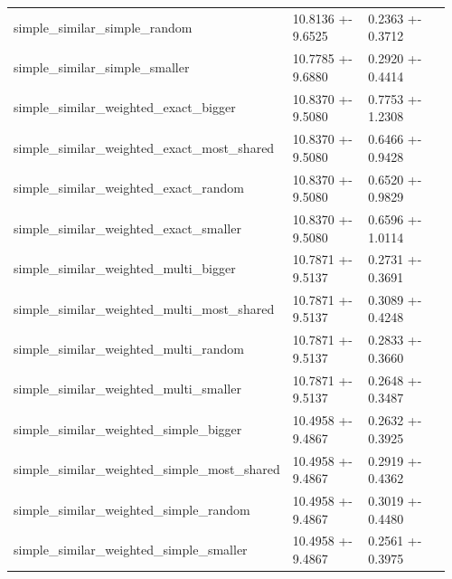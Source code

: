 \begin{table}
\begin{tabular}{p{0.42\linewidth}p{0.24\linewidth}p{0.30\linewidth}}
simple\_similar\_simple\_random & 10.8136 +- 9.6525 & 0.2363 +- 0.3712 \\
simple\_similar\_simple\_smaller & 10.7785 +- 9.6880 & 0.2920 +- 0.4414 \\
simple\_similar\_weighted\_exact\_bigger & 10.8370 +- 9.5080 & 0.7753 +- 1.2308 \\
simple\_similar\_weighted\_exact\_most\_shared & 10.8370 +- 9.5080 & 0.6466 +- 0.9428 \\
simple\_similar\_weighted\_exact\_random & 10.8370 +- 9.5080 & 0.6520 +- 0.9829 \\
simple\_similar\_weighted\_exact\_smaller & 10.8370 +- 9.5080 & 0.6596 +- 1.0114 \\
simple\_similar\_weighted\_multi\_bigger & 10.7871 +- 9.5137 & 0.2731 +- 0.3691 \\
simple\_similar\_weighted\_multi\_most\_shared & 10.7871 +- 9.5137 & 0.3089 +- 0.4248 \\
simple\_similar\_weighted\_multi\_random & 10.7871 +- 9.5137 & 0.2833 +- 0.3660 \\
simple\_similar\_weighted\_multi\_smaller & 10.7871 +- 9.5137 & 0.2648 +- 0.3487 \\
simple\_similar\_weighted\_simple\_bigger & 10.4958 +- 9.4867 & 0.2632 +- 0.3925 \\
simple\_similar\_weighted\_simple\_most\_shared & 10.4958 +- 9.4867 & 0.2919 +- 0.4362 \\
simple\_similar\_weighted\_simple\_random & 10.4958 +- 9.4867 & 0.3019 +- 0.4480 \\
simple\_similar\_weighted\_simple\_smaller & 10.4958 +- 9.4867 & 0.2561 +- 0.3975 \\
\bottomrule
\end{tabular}
\end{table}
